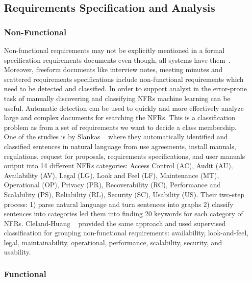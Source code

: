 \subsection{Requirements Specification and Analysis}

\subsubsection{Non-Functional}

Non-functional requirements may not be explicitly mentioned in a formal
specification requirements documents even though, all systems have
them~\cite{Slankas:2013}. Moreover, freeform documents like interview notes,
meeting minutes and scattered requirements specifications include non-functional
requirements which need to be detected and classified. In order to support
analyst in the error-prone task of manually discovering and classifying NFRs
machine learning can be useful. Automatic detection can be used to quickly and
more effectively analyze large and complex documents for searching the
NFRs\cite{Cleland-Huang2007}. This is a classification problem as from a set of
requirements we want to decide a class membership. \\

One of the studies is by Slankas \etal~\cite{Slankas:2013} where they
automatically identified and classified sentences in natural language from use
agreements, install manuals, regulations, request for proposals, requirements
specifications, and user manuals output into 14 different NFRs categories:
Access Control (AC), Audit (AU), Availability (AV), Legal (LG), Look and Feel
(LF), Maintenance (MT), Operational (OP), Privacy (PR), Recoverability (RC),
Performance and Scalability (PS), Reliability (RL), Security (SC), Usability
(US). Their two-step process: 1) parse natural language and turn sentences into
graphs 2) classify sentences into categories led them into finding 20 keywords
for each category of NFRs. \newline Cleland-Huang \etal~\cite{Cleland-Huang2007}
provided the same approach and used supervised classification for grouping
non-functional requirements: availability, look-and-feel, legal,
maintainability, operational, performance, scalability, security, and usability.

\subsubsection{Functional}

